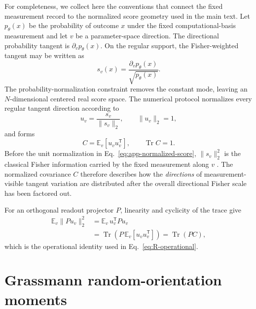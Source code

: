 \documentclass[aps,pra,reprint,superscriptaddress,nofootinbib,longbibliography]{revtex4-2}
\newcommand{\Tr}{\operatorname{Tr}}
\begin{document}
For completeness, we collect here the conventions that connect the fixed measurement record to the normalized score geometry used in the main text.  Let $p_\theta(x)$ be the probability of outcome $x$ under the fixed computational-basis measurement and let $v$ be a parameter-space direction.  The directional probability tangent is $\partial_v p_\theta(x)$.  On the regular support, the Fisher-weighted tangent may be written as
\begin{equation}
 s_v(x)=\frac{\partial_v p_\theta(x)}{\sqrt{p_\theta(x)}}.
\label{eq:app-score}
\end{equation}
The probability-normalization constraint removes the constant mode, leaving an $N$-dimensional centered real score space.  The numerical protocol normalizes every regular tangent direction according to
\begin{equation}
 u_v=\frac{s_v}{\|s_v\|_2},\qquad \|u_v\|_2=1,
\label{eq:app-normalized-score}
\end{equation}
and forms
\begin{equation}
 C=\mathbb E_v[u_vu_v^{\mathsf T}],\qquad \Tr C=1.
\label{eq:app-C}
\end{equation}
Before the unit normalization in Eq.~\eqref{eq:app-normalized-score}, $\|s_v\|_2^2$ is the classical Fisher information carried by the fixed measurement along $v$ \cite{BraunsteinCaves1994,LuLuoOh2012}.  The normalized covariance $C$ therefore describes how the \emph{directions} of measurement-visible tangent variation are distributed after the overall directional Fisher scale has been factored out.

For an orthogonal readout projector $P$, linearity and cyclicity of the trace give
\begin{align}
\mathbb E_v\|Pu_v\|_2^2
&=\mathbb E_v\,u_v^{\mathsf T}Pu_v \\
&=\Tr\!\left(P\,\mathbb E_v[u_vu_v^{\mathsf T}]\right)
=\Tr(PC),
\label{eq:app-R}
\end{align}
which is the operational identity used in Eq.~\eqref{eq:R-operational}.

\section{Grassmann random-orientation moments}
\label{app:grassmann}
\end{document}
